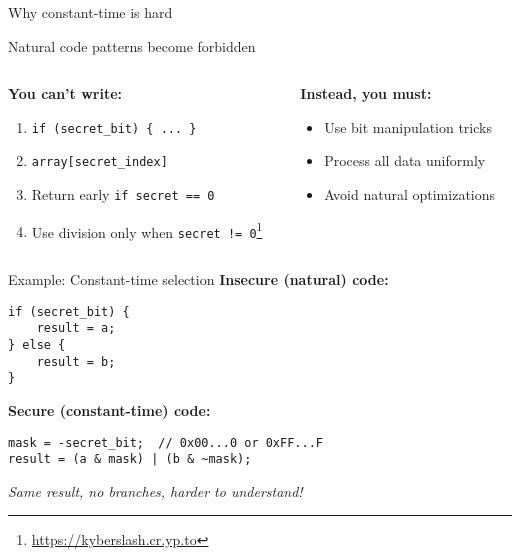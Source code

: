 \documentclass[aspectratio=169, lualatex, handout]{beamer}
\begin{document}
\begin{frame}{Why constant-time is hard}
	\begin{center}
		\Large
		Natural code patterns become forbidden
	\end{center}
	\begin{columns}[t]
		\begin{column}{0.5\textwidth}
			\textbf{You can't write:}
			\begin{enumerate}
				\item \texttt{if (secret\_bit) \{ ... \}}
				\item \texttt{array[secret\_index]}
				\item Return early \texttt{if secret == 0}
				\item Use division only when \texttt{secret != 0}\footnote{\url{https://kyberslash.cr.yp.to}}
			\end{enumerate}
		\end{column}
		\begin{column}{0.5\textwidth}
			\textbf{Instead, you must:}
			\begin{itemize}
				\item Use bit manipulation tricks
				\item Process all data uniformly
				\item Avoid natural optimizations
			\end{itemize}
		\end{column}
	\end{columns}
\end{frame}

\begin{frame}{Example: Constant-time selection}
	\textbf{Insecure (natural) code:}
	\begin{flushleft}
		\texttt{if (secret\_bit) \{}\\
		\texttt{~~~~result = a;}\\
		\texttt{\} else \{}\\
		\texttt{~~~~result = b;}\\
		\texttt{\}}
	\end{flushleft}
	\vspace{0.5em}
	\textbf{Secure (constant-time) code:}
	\begin{flushleft}
		\texttt{mask = -secret\_bit;~~// 0x00...0 or 0xFF...F}\\
		\texttt{result = (a \& mask) | (b \& \textasciitilde mask);}
	\end{flushleft}
	\vspace{0.5em}
	\begin{center}
		\textit{Same result, no branches, harder to understand!}
	\end{center}
\end{frame}
\end{document}
